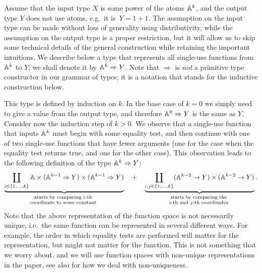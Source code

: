 \begin{example}\label{ex:decision-tree-types} Assume that the input type $X$ is some power of the atoms $\mathbb A^k$, and the output type $Y$ does not use atoms, e.g.~it is~$Y = 1 +1$. The assumption on the input type can be made without loss of generality using distributivity, while the assumption on the output type is a proper restriction, but it will allow us to skip some technical details of the general construction while retaining the important intuitions. 
We describe below a type that represents all single-use functions from $\mathbb A^k$ to $Y$; we shall denote it by $\mathbb A^k \Rightarrow Y$. Note that $\Rightarrow$ is \emph{not} a primitive type constructor in our grammar of types; it is a notation that stands for the inductive construction below.

This type is defined by  induction on $k$. In the base case of $k=0$ we simply need to give a value from the output type, and therefore $\mathbb A^0 \Rightarrow Y$ is the same as $Y$. Consider now the induction step of $k > 0$.  
    We observe that a single-use function that inputs $\mathbb A^k$ must begin with some equality test, and then continue with one of two single-use functions that have fewer arguments (one for the case when the equality test returns true, and one for the other case). This observation leads to the following definition of the type $\mathbb A^k \Rightarrow Y$:
\begin{align*}
\myunderbrace{ \coprod_{i \in \set{1,\ldots,k}} 
    \atoms \times (\atoms^{k-1} \Rightarrow Y) \times (\atoms^{k-1} \Rightarrow Y)
 }{starts by comparing $i$-th  \\
 coordinate to some constant}  \quad + \quad 
\myunderbrace{\coprod_{i, j \in \set{1,\ldots,k}} (\atoms^{k-2} \to Y) \times (\atoms^{k-2} \to Y)}{
    starts by comparing the \\ 
    $i$-th and $j$-th coordinates}.
\end{align*}
Note that the above representation of the function space is not necessarily unique, i.e.~the same function can be represented in several different ways. For example, the order in which equality tests are performed will matter for the representation, but might not matter for the function. This is not something that we worry about, and we will use function spaces with non-unique representations in the paper, see also  for how we deal with non-uniqueness. \exampleend
\end{example}


